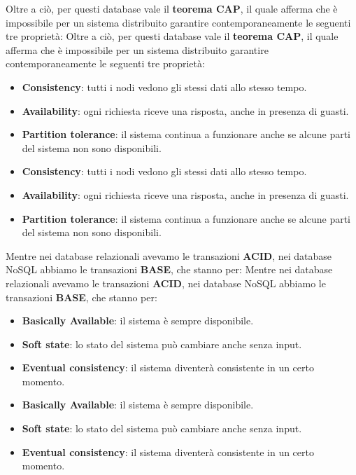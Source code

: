 Oltre a ciò, per questi database vale il \textbf{teorema CAP}, il quale afferma
che è impossibile per un sistema distribuito garantire contemporaneamente le
seguenti tre proprietà:
Oltre a ciò, per questi database vale il \textbf{teorema CAP}, il quale afferma
che è impossibile per un sistema distribuito garantire contemporaneamente le
seguenti tre proprietà:
\begin{itemize}
      \item \textbf{Consistency}: tutti i nodi vedono gli stessi dati allo stesso
            tempo.
      \item \textbf{Availability}: ogni richiesta riceve una risposta, anche in
            presenza di guasti.
      \item \textbf{Partition tolerance}: il sistema continua a funzionare anche
            se alcune parti del sistema non sono disponibili.
      \item \textbf{Consistency}: tutti i nodi vedono gli stessi dati allo stesso
            tempo.
      \item \textbf{Availability}: ogni richiesta riceve una risposta, anche in
            presenza di guasti.
      \item \textbf{Partition tolerance}: il sistema continua a funzionare anche
            se alcune parti del sistema non sono disponibili.
\end{itemize}
Mentre nei database relazionali avevamo le transazioni \textbf{ACID}, nei database
NoSQL abbiamo le transazioni \textbf{BASE}, che stanno per:
Mentre nei database relazionali avevamo le transazioni \textbf{ACID}, nei database
NoSQL abbiamo le transazioni \textbf{BASE}, che stanno per:
\begin{itemize}
      \item \textbf{Basically Available}: il sistema è sempre disponibile.
      \item \textbf{Soft state}: lo stato del sistema può cambiare anche senza
            input.
      \item \textbf{Eventual consistency}: il sistema diventerà consistente in un
            certo momento.
      \item \textbf{Basically Available}: il sistema è sempre disponibile.
      \item \textbf{Soft state}: lo stato del sistema può cambiare anche senza
            input.
      \item \textbf{Eventual consistency}: il sistema diventerà consistente in un
            certo momento.
\end{itemize}

